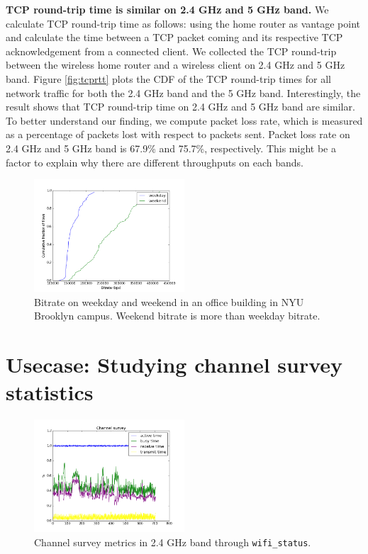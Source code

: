 \textbf{TCP round-trip time is similar on 2.4 GHz and 5 GHz band.} We calculate TCP round-trip time as follows: using the home router as vantage point and calculate the time between a TCP packet coming and its respective TCP acknowledgement from a connected client. We collected the TCP round-trip between the wireless home router and a wireless client on 2.4 GHz and 5 GHz band. Figure \ref{fig:tcprtt} plots the CDF of the TCP round-trip times for all network traffic for both the 2.4 GHz band and the 5 GHz band. Interestingly, the result shows that TCP round-trip time on 2.4 GHz and 5 GHz band are similar. To better understand our finding, we compute packet loss rate, which is measured as a percentage of packets lost with respect to packets sent. Packet loss rate on 2.4 GHz and 5 GHz band is 67.9\% and 75.7\%, respectively. This might be a factor to explain why there are different throughputs on each bands.  

\begin{figure}
\centering
\includegraphics[width=0.5\textwidth]{figure/bitrate(weekday_vs_weekend).png}
\caption{Bitrate on weekday and weekend in an office building in NYU Brooklyn campus. Weekend bitrate is more than weekday bitrate.} 
\label{fig:compare}
\end{figure}  

\section{Usecase: Studying channel survey statistics}
\label{sec.usecase2}

\begin{figure}
\centering
\includegraphics[width=0.5\textwidth]{figure/channel.png}
\caption{Channel survey metrics in 2.4 GHz band through \texttt{wifi\_status}.} 
\label{fig:channelsurvey}
\end{figure}

